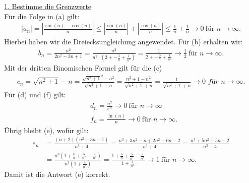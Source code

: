 \underline{1. Bestimme die Grenzwerte}\\
Für die Folge in (a) gilt:
\begin{align*}
	|a_n| =
	\left|
	\frac{\sin(n) - \cos(n)}{n}
	\right|
	\leq
	\left|
	\frac{\sin(n)}{n}
	\right|
	+
	\left|
	\frac{\cos(n)}{n}
	\right|
	\leq 
	\frac{1}{n} + \frac{1}{n} \to 0 \ \textrm{für } n \to \infty.
\end{align*}
Hierbei haben wir die Dreiecksungleichung angewendet.
Für (b) erhalten wir:
\begin{align*}
	b_n = \frac{n^2}{2n^2 - 3n +1 }
	= \frac{n^2}{n^2 \cdot \left( 2+ -\frac{3}{n} + \frac{1}{n^2}\right)}
	=
	\frac{1}{   2+ -\frac{3}{n} + \frac{1}{n^2}}
	\to \frac{1}{2} \ \textrm{für } n \to \infty.
\end{align*}
Mit der dritten Binomischen Formel gilt für die (c)
\begin{align*}
	c_n = \sqrt{n^2 +1} - n
	= \frac{\sqrt{n^2 +1}^2  - n^2}{\sqrt{n^2 +1 } + n}
	= \frac{n^2 +1  - n^2}{\sqrt{n^2 +1 } + n}
	=
	\frac{1}{\sqrt{n^2 +1 } + n} \to 0 \textit{ für } n \to \infty.
\end{align*}
Für (d) und (f) gilt:
\begin{align*}
	&d_n = \frac{n^2}{ e^n} \to 0  \ \textrm{für } n \to \infty\\
	&f_n = \frac{\ln(n)}{n} \to 0 \ \textrm{für } n \to \infty.
\end{align*}
Übrig bleibt (e), wofür gilt:
\begin{align*}
	e_n
	&=
	\frac{(n+2) (n^2 + 3n -1)}{n^3 +4 }
	= \frac{n^3 +3 n^2 - n + 2 n^2 +6n -2}{n^3 + 4}
	= \frac{n^3 +5 n^2 +5 n -2}{n^3 + 4}\\
	&= \frac{n^3 \left( 1 +\frac{6}{n} +\frac{5 }{n^2} -\frac{2}{n^3} \right)}{n^3 \left( 1 + \frac{4}{n^3} \right)}
	=
	\frac{ 1 +\frac{6}{n} +\frac{5 }{n^2} -\frac{2}{n^3}}{  1 + \frac{4}{n^3}}
	\to 1 \ \textrm{für } n \to \infty.
\end{align*}
Damit ist die Antwort (e) korrekt.
\newpage

